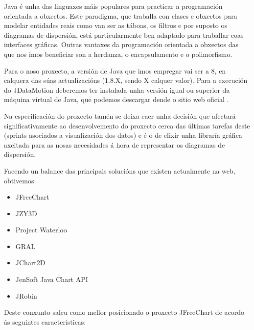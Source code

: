 Java é unha das linguaxes máis populares para practicar a programación orientada a obxectos. Este paradigma, que traballa con clases e obxectos para modelar entidades reais como van ser as táboas, os filtros e por suposto os diagramas de dispersión, está particularmente ben adaptado para traballar coas interfaces gráficas. Outras vantaxes da programación orientada a obxectos das que nos imos beneficiar son a herdanza, o encapsulamento e o polimorfismo.

Para o noso proxecto, a versión de Java que imos empregar vai ser a 8, en calquera das súas actualizacións (1.8.X, sendo X calquer valor). Para a execución do JDataMotion deberemos ter instalada unha versión igual ou superior da máquina virtual de Java, que podemos descargar dende o sitio web oficial \cite{java}.


Na especificación do proxecto tamén se deixa caer unha decisión que afectará significativamente ao desenvolvemento do proxecto cerca das últimas tarefas deste (sprints asociados a visualización dos datos) e é o de elixir unha libraría gráfica axeitada para as nosas necesidades á hora de representar os diagramas de dispersión.

Facendo un balance das principais solucións que existen actualmente na web, obtivemos:

\begin{itemize}
\item JFreeChart
\item JZY3D
\item Project Waterloo
\item GRAL
\item JChart2D
\item JenSoft Java Chart API
\item JRobin
\end{itemize} 

Deste conxunto saleu como mellor posicionado o proxecto JFreeChart \cite{jfreechart} de acordo ás seguintes características:

